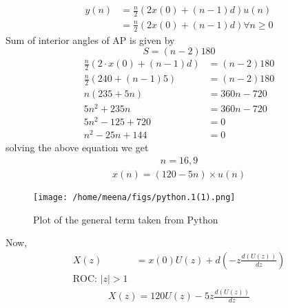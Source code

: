 \documentclass[journal,12pt,twocolumn]{IEEEtran}
\theoremstyle{remark}
\begin{document}
\begin{align}
    y(n) &= \frac{n}{2}\left(2x(0) + (n-1)d\right)u(n) \\
    &= \frac{n}{2}\left(2x(0) + (n-1)d \right)\forall n \geq 0
\end{align}
Sum of interior angles of AP is given by
\begin{equation}
    S=(n-2)180
\end{equation}
\begin{align}
\frac{n}{2}(2\cdot x(0)+(n-1)d)&= (n-2)180\\
    \frac{n}{2}(240+(n-1)5)&=(n-2)180\\
    n(235+5n)&=360n-720\\
    5n^2+235n&=360n-720\\
    5n^2-125+720&=0\\
    n^2-25n+144&=0
\end{align}
solving the above equation we get
\begin{align}
   n=16,9
\end{align}
\begin{align}
 \boxed{x(n)=(120-5n)\times u(n)}   
\end{align}
\begin{figure}[h]
  \centering
  \texttt{[image: /home/meena/figs/python.1(1).png]} 
  \captionsetup{justification=centering}
  \caption{Plot of the general term taken from Python}
  \label{fig:your_label}
\end{figure}
Now,
\begin{align}
   X(z)&=x(0)U(z)+d\left(-z\frac{d(U(z))}{dz}\right)\\
 \text{ROC: $|z|>1$}
\end{align}
\begin{align}
    \boxed{X(z)=120U(z)-5z\frac{d(U(z))}{dz}}   
\end{align}
\end{document}
